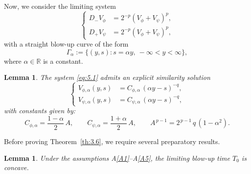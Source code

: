 \documentclass[
  sn-mathphys-num,
  colorlinks,
  linkcolor=darkmagenta,
  citecolor=rufous,
  urlcolor=zaffre,
  hypertexnames=false
]{sn-jnl}
\numberwithin{equation}{section}
\newtheorem{lemma}[theorem]{Lemma}%
\begin{document}
Now, we consider the limiting system
\begin{equation}\label{eq:5.1}
\left\{
\begin{aligned}
D_-V_\phi &= 2^{-p}(V_\phi + V_\psi)^p, \\
D_+V_\psi &= 2^{-p}(V_\phi + V_\psi)^p,
\end{aligned}
\right.
\end{equation}
with a straight blow-up curve of the form
\begin{equation}\label{eq:5.2}
\Gamma_\alpha := \{(y,s) : s = \alpha y, \ -\infty < y < \infty\},
\end{equation}
where \(\alpha \in \mathbb{R}\) is a constant.
\begin{lemma}
The system \eqref{eq:5.1} admits an explicit similarity solution
\begin{equation}\label{eq:5.3}
\left\{
\begin{aligned}
V_{\phi,\alpha}(y,s) &= C_{\phi,\alpha}\,(\alpha y - s)^{-q}, \\
V_{\psi,\alpha}(y,s) &= C_{\psi,\alpha}\,(\alpha y - s)^{-q},
\end{aligned}
\right.
\end{equation}
with constants given by:
$$
C_{\phi,\alpha}=\frac{1-\alpha}{2}\,A,\qquad
C_{\psi,\alpha}=\frac{1+\alpha}{2}\,A,\qquad
A^{\,p-1}=2^{\,p-1}\,q\,(1-\alpha^2).
$$
\end{lemma}
Before proving  Theorem~\ref{th:3.6},  we require several preparatory results.
\begin{lemma}\label{lem:5.2}
Under the assumptions A\ref{A1}--A\ref{A5}, the limiting blow-up time $T_0$ is concave.
\end{lemma}
\end{document}

